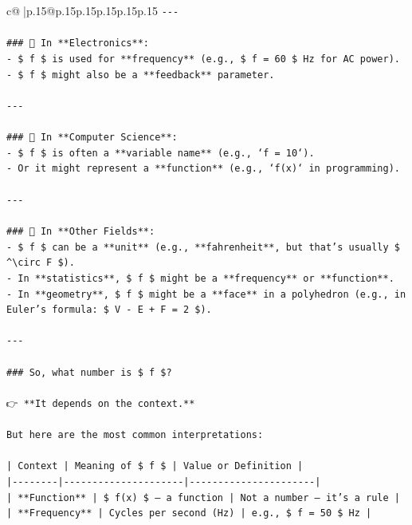 \documentclass{article}
\begin{document}
{\begin{supertabular}{c@{$\;$}|p{.15\linewidth}@{}p{.15\linewidth}p{.15\linewidth}p{.15\linewidth}p{.15\linewidth}p{.15\linewidth}}
{{{\texttt{{-}{-}{-}} \\
\\ 
\texttt{\#\#\# 🔹 In **Electronics**:} \\
\texttt{{-} \$ f \$ is used for **frequency** (e.g., \$ f = 60 \$ Hz for AC power).} \\
\texttt{{-} \$ f \$ might also be a **feedback** parameter.} \\
\\ 
\texttt{{-}{-}{-}} \\
\\ 
\texttt{\#\#\# 🔹 In **Computer Science**:} \\
\texttt{{-} \$ f \$ is often a **variable name** (e.g., `f = 10`).} \\
\texttt{{-} Or it might represent a **function** (e.g., `f(x)` in programming).} \\
\\ 
\texttt{{-}{-}{-}} \\
\\ 
\texttt{\#\#\# 🔹 In **Other Fields**:} \\
\texttt{{-} \$ f \$ can be a **unit** (e.g., **fahrenheit**, but that's usually \$ \^{}\textbackslash{}circ F \$).} \\
\texttt{{-} In **statistics**, \$ f \$ might be a **frequency** or **function**.} \\
\texttt{{-} In **geometry**, \$ f \$ might be a **face** in a polyhedron (e.g., in Euler's formula: \$ V {-} E + F = 2 \$).} \\
\\ 
\texttt{{-}{-}{-}} \\
\\ 
\texttt{\#\#\# So, what number is \$ f \$?} \\
\\ 
\texttt{👉 **It depends on the context.**} \\
\\ 
\texttt{But here are the most common interpretations:} \\
\\ 
\texttt{| Context | Meaning of \$ f \$ | Value or Definition |} \\
\texttt{|{-}{-}{-}{-}{-}{-}{-}{-}|{-}{-}{-}{-}{-}{-}{-}{-}{-}{-}{-}{-}{-}{-}{-}{-}{-}{-}{-}{-}{-}|{-}{-}{-}{-}{-}{-}{-}{-}{-}{-}{-}{-}{-}{-}{-}{-}{-}{-}{-}{-}{-}{-}|} \\
\texttt{| **Function** | \$ f(x) \$ — a function | Not a number — it's a rule |} \\
\texttt{| **Frequency** | Cycles per second (Hz) | e.g., \$ f = 50 \$ Hz |} \\
}}}
\end{supertabular}}
\end{document}
